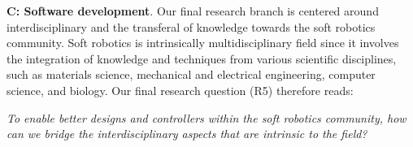 
\textbf{C: Software development}. Our final research branch is centered around interdisciplinary and the transferal of knowledge towards the soft robotics community. Soft robotics is intrinsically multidisciplinary field since it involves the integration of knowledge and techniques from various scientific disciplines, such as materials science, mechanical and electrical engineering, computer science, and biology. Our final research question (R5) therefore reads:

\begin{center}
\textit{To enable better designs and controllers within the soft robotics community, how can we bridge the interdisciplinary aspects that are intrinsic to the field?}
\end{center}


